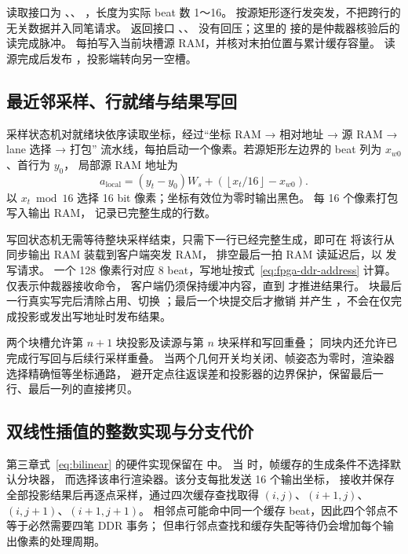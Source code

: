 读取接口为 、、
，长度为实际 beat 数 1～16。
按源矩形逐行发突发，不把跨行的无关数据并入同笔请求。
返回接口 、、
没有回压；这里的  接的是仲裁器核验后的读完成脉冲。
每拍写入当前块槽源 RAM，并核对末拍位置与累计缓存容量。
读源完成后发布 ，投影端转向另一空槽。

\subsection{最近邻采样、行就绪与结果写回}
采样状态机对就绪块依序读取坐标，经过“坐标 RAM → 相对地址 → 源 RAM → lane 选择 → 打包”
流水线，每拍启动一个像素。若源矩形左边界的 beat 列为 $x_{w0}$、首行为 $y_0$，
局部源 RAM 地址为
\begin{equation}
a_{\mathrm{local}}=(y_t-y_0)W_s+
\left(\left\lfloor x_t/16\right\rfloor-x_{w0}\right).
\end{equation}
以 $x_t\bmod16$ 选择 16 bit 像素；坐标有效位为零时输出黑色。
每 16 个像素打包写入输出 RAM， 记录已完整生成的行数。

写回状态机无需等待整块采样结束，只需下一行已经完整生成，即可在
 将该行从同步输出 RAM 装载到客户端突发 RAM，
排空最后一拍 RAM 读延迟后，以  发写请求。
一个 128 像素行对应 8 beat，写地址按式~\eqref{eq:fpga-ddr-address} 计算。
 仅表示仲裁器接收命令，
客户端仍须保持缓冲内容，直到  才推进结果行。
块最后一行真实写完后清除占用、切换 ；最后一个块提交后才撤销
 并产生 ，不会在仅完成投影或发出写地址时发布结果。

两个块槽允许第 $n+1$ 块投影及读源与第 $n$ 块采样和写回重叠；
同块内还允许已完成行写回与后续行采样重叠。
当两个几何开关均关闭、帧姿态为零时，渲染器选择精确恒等坐标通路，
避开定点往返误差和投影器的边界保护，保留最后一行、最后一列的直接拷贝。

\subsection{双线性插值的整数实现与分支代价}
第三章式~\eqref{eq:bilinear} 的硬件实现保留在  中。
当  时，帧缓存的生成条件不选择默认分块器，
而选择该串行渲染器。该分支每批发送 16 个输出坐标，
接收并保存全部投影结果后再逐点采样，通过四次缓存查找取得
$(i,j)$、$(i+1,j)$、$(i,j+1)$、$(i+1,j+1)$。
相邻点可能命中同一个缓存 beat，因此四个邻点不等于必然需要四笔 DDR 事务；
但串行邻点查找和缓存失配等待仍会增加每个输出像素的处理周期。


